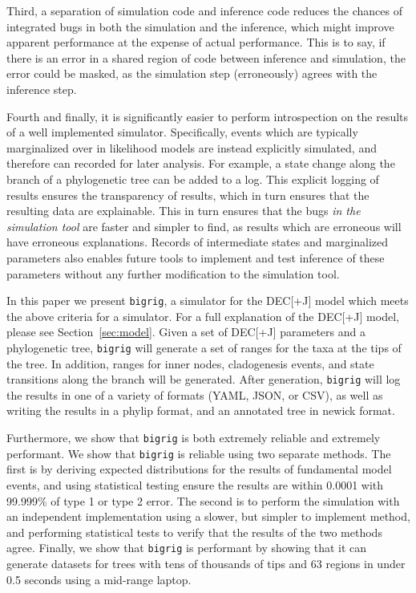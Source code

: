 \documentclass{article}
\newcommand{\bigrig}{\texttt{bigrig}}
\newcommand{\decj}{DEC[+J]}
\begin{document}
Third, a separation of simulation code and inference code reduces the chances of integrated bugs in both the simulation
and the inference, which might improve apparent performance at the expense of actual performance.
This is to say, if there is an error in a shared region of code between inference and simulation, the error could be
masked, as the simulation step (erroneously) agrees with the inference step.

Fourth and finally, it is significantly easier to perform introspection on the results of a well implemented simulator.
Specifically, events which are typically marginalized over in likelihood models are instead explicitly simulated, and
therefore can recorded for later analysis.
For example, a state change along the branch of a phylogenetic tree can be added to a log.
This explicit logging of results ensures the transparency of results, which in turn ensures that the resulting data are
explainable.
This in turn ensures that the bugs \textit{in the simulation tool} are faster and simpler to find, as results which are
erroneous will have erroneous explanations.
Records of intermediate states and marginalized parameters also enables future tools to implement and test inference of
these parameters without any further modification to the simulation tool.

In this paper we present \bigrig{}, a simulator for the \decj{}  model
which meets the above criteria for a simulator. For a full explanation of the \decj{} model, please see
Section~\ref{sec:model}.
Given a set of \decj{} parameters and a phylogenetic tree, \bigrig{} will generate a set of ranges for the taxa at the
tips of the tree.
In addition, ranges for inner nodes, cladogenesis events, and state transitions along the branch will be generated.
After generation, \bigrig{} will log the results in one of a variety of formats (YAML, JSON, or CSV), as well as writing
the results in a phylip format, and an annotated tree in newick format.

Furthermore, we show that \bigrig{} is both extremely reliable and extremely performant.
We show that \bigrig{} is reliable using two separate methods.
The first is by deriving expected distributions for the results of fundamental model events, and using statistical
testing ensure the results are within 0.0001 with 99.999\% of type 1 or type 2 error.
The second is to perform the simulation with an independent implementation using a slower, but simpler to implement
method, and performing statistical tests to verify that the results of the two methods agree.
Finally, we show that \bigrig{} is performant by showing that it can generate datasets for trees with tens of thousands
of tips and 63 regions in under 0.5  seconds using a mid-range laptop.
\end{document}
